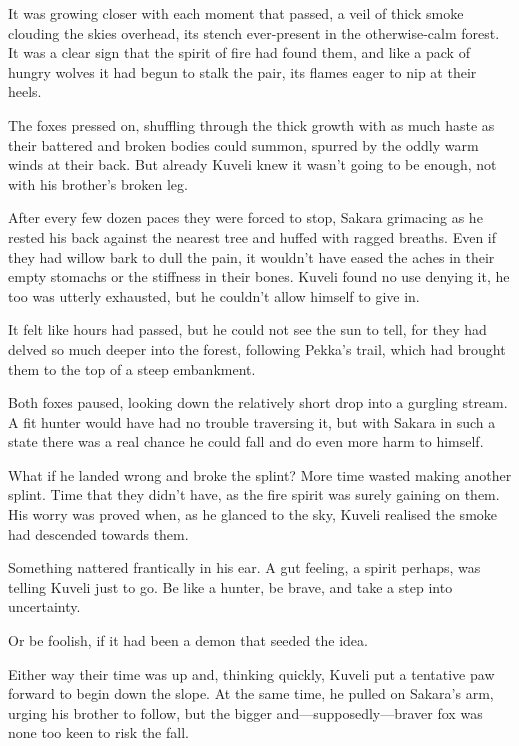\secdiv

\noindent It was growing closer with each moment that passed, a veil of thick smoke clouding the skies overhead, its stench ever-present in the otherwise-calm forest. It was a clear sign that the spirit of fire had found them, and like a pack of hungry wolves it had begun to stalk the pair, its flames eager to nip at their heels.

The foxes pressed on, shuffling through the thick growth with as much haste as their battered and broken bodies could summon, spurred by the oddly warm winds at their back. But already Kuveli knew it wasn't going to be enough, not with his brother's broken leg.

After every few dozen paces they were forced to stop, Sakara grimacing as he rested his back against the nearest tree and huffed with ragged breaths. Even if they had willow bark to dull the pain, it wouldn't have eased the aches in their empty stomachs or the stiffness in their bones. Kuveli found no use denying it, he too was utterly exhausted, but he couldn't allow himself to give in.

It felt like hours had passed, but he could not see the sun to tell, for they had delved so much deeper into the forest, following Pekka's trail, which had brought them to the top of a steep embankment.

Both foxes paused, looking down the relatively short drop into a gurgling stream. A fit hunter would have had no trouble traversing it, but with Sakara in such a state there was a real chance he could fall and do even more harm to himself.

What if he landed wrong and broke the splint? More time wasted making another splint. Time that they didn't have, as the fire spirit was surely gaining on them. His worry was proved when, as he glanced to the sky, Kuveli realised the smoke had descended towards them.

Something nattered frantically in his ear. A gut feeling, a spirit perhaps, was telling Kuveli just to go. Be like a hunter, be brave, and take a step into uncertainty.

Or be foolish, if it had been a demon that seeded the idea.

Either way their time was up and, thinking quickly, Kuveli put a tentative paw forward to begin down the slope. At the same time, he pulled on Sakara's arm, urging his brother to follow, but the bigger and---supposedly---braver fox was none too keen to risk the fall.

